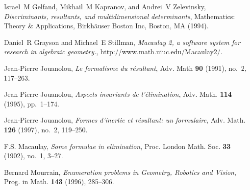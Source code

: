 \documentclass[10pt]{amsart}
\theoremstyle{plain}
\theoremstyle{definition}
\begin{document}
\begin{thebibliography}{BEM01}
Israel~M Gel{\cprime}fand, Mikhail~M Kapranov, and Andrei~V Zelevinsky,
  \emph{Discriminants, resultants, and multidimensional determinants},
  Mathematics: Theory \& Applications, Birkh{\"a}user Boston Inc, Boston, MA
  (1994).

Daniel~R Grayson and Michael~E Stillman, \emph{Macaulay 2, a software system
  for research in algebraic geometry.}, http://www.math.uiuc.edu/Macaulay2/.

Jean-Pierre Jouanolou, \emph{Le formalisme du r{\'e}sultant}, Adv. Math
  \textbf{90} (1991), no.~2, 117--263.

Jean-Pierre Jouanolou, \emph{Aspects invariants de l'{\'e}limination}, Adv.
  Math. \textbf{114} (1995),
  pp.~1--174.

Jean-Pierre Jouanolou, \emph{Formes d'inertie et r\'esultant: un formulaire}, Adv.
  Math. \textbf{126} (1997), no.~2, 119--250.
  
F.S. Macaulay, \emph{Some formulae in elimination}, Proc. London Math. Soc.
  \textbf{33} (1902), no.~1, 3--27.

Bernard Mourrain, \emph{Enumeration problems in {G}eometry, {R}obotics and
  {V}ision}, Prog. in Math. \textbf{143} (1996), 285--306.

\end{thebibliography}


\end{document}
